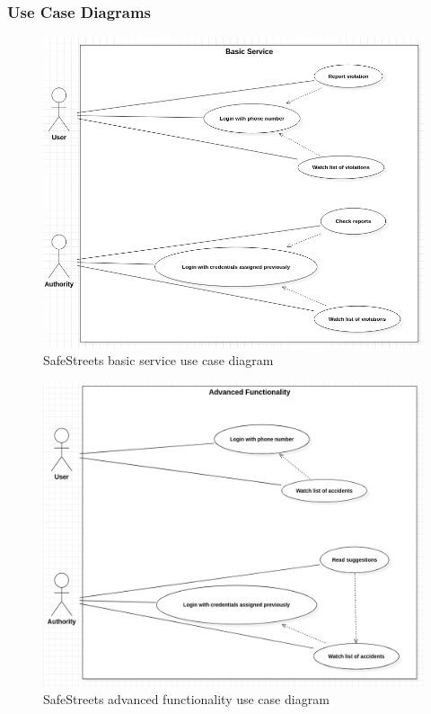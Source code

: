 \subsubsection{Use Case Diagrams}

\begin{figure}[H]
\includegraphics[scale=0.41]{Images/Diagrams/UseCase1.png}
\caption{\label{fig:UseCase1}SafeStreets basic service use case diagram}
\end{figure}

\begin{figure}[H]
\includegraphics[scale=0.34]{Images/Diagrams/UseCase2.png}
\caption{\label{fig:UseCase2}SafeStreets advanced functionality use case diagram}
\end{figure}

